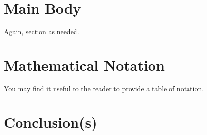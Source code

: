 \documentclass{bcthesis}
\begin{document}

\chapter{Main Body}%
\label{sec:structured-writing}

Again, section as needed.

\chapter{Mathematical Notation}%
\label{sec:mathematical-notation}

You may find it useful to the reader to provide a table of notation. 

\chapter{Conclusion(s)}


\backmatter

\nocite{*}


\end{document}
